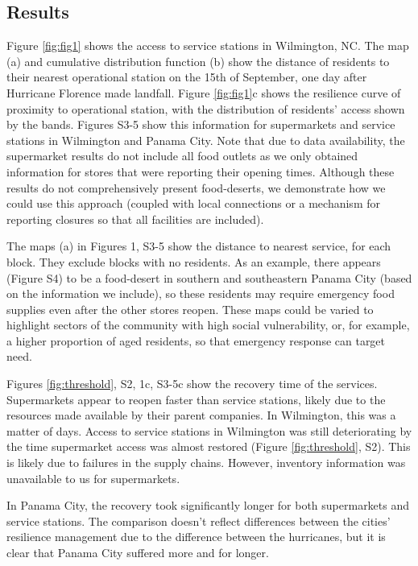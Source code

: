 \documentclass[9pt,twocolumn,twoside,lineno]{pnas-new}
\begin{document}
\subsection*{Results}
Figure \ref{fig:fig1} shows the access to service stations in Wilmington, NC. The map (a) and cumulative distribution function (b) show the distance of residents to their nearest operational station on the 15th of September, one day after Hurricane Florence made landfall. Figure \ref{fig:fig1}c  shows the resilience curve of proximity to operational station, with the distribution of residents’ access shown by the bands.
Figures S3-5 show this information for supermarkets and service stations in Wilmington and Panama City. 
Note that due to data availability, the supermarket results do not include all food outlets as we only obtained information for stores that were reporting their opening times.
Although these results do not comprehensively present food-deserts, we demonstrate how we could use this approach (coupled with local connections or a mechanism for reporting closures so that all facilities are included).

The maps (a) in Figures 1, S3-5 show the distance to nearest service, for each block.
They exclude blocks with no residents.
As an example, there appears (Figure S4) to be a food-desert in southern and southeastern Panama City (based on the information we include), so these residents may require emergency food supplies even after the other stores reopen.
These maps could be varied to highlight sectors of the community with high social vulnerability, or, for example, a higher proportion of aged residents, so that emergency response can target need.

Figures \ref{fig:threshold}, S2, 1c, S3-5c show the recovery time of the services. 
Supermarkets appear to reopen faster than service stations, likely due to the resources made available by their parent companies.
In Wilmington, this was a matter of days.
Access to service stations in Wilmington was still deteriorating by the time supermarket access was almost restored (Figure \ref{fig:threshold}, S2).
This is likely due to failures in the supply chains.
However, inventory information was unavailable to us for supermarkets.

In Panama City, the recovery took significantly longer for both supermarkets and service stations.
The comparison doesn't reflect differences between the cities' resilience management due to the difference between the hurricanes, but it is clear that Panama City suffered more and for longer.
\end{document}
